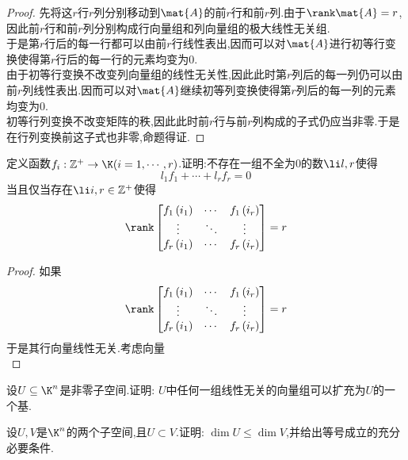 \documentclass{ctexart}
\begin{document}
\begin{proof}
    先将这$r$行$r$列分别移动到$\mat{A}$的前$r$行和前$r$列.由于$\rank\mat{A}=r$,因此前$r$行和前$r$列分别构成行向量组和列向量组的极大线性无关组.\\
    于是第$r$行后的每一行都可以由前$r$行线性表出,因而可以对$\mat{A}$进行初等行变换使得第$r$行后的每一行的元素均变为$0$.\\
    由于初等行变换不改变列向量组的线性无关性,因此此时第$r$列后的每一列仍可以由前$r$列线性表出.因而可以对$\mat{A}$继续初等列变换使得第$r$列后的每一列的元素均变为$0$.\\
    初等行列变换不改变矩阵的秩,因此此时前$r$行与前$r$列构成的子式仍应当非零.于是在行列变换前这子式也非零,命题得证.
\end{proof}
\begin{problem}
    定义函数$f_i:\mathbb{Z}^+\to\K(i=1,\cdots,r)$.证明:不存在一组不全为$0$的数$\li l,r$使得
    \[l_1f_1+\cdots+l_rf_r=0\]
    当且仅当存在$\li i,r\in\mathbb{Z}^+$使得
    \[\rank\begin{bmatrix}
        f_1\left(i_1\right)&\cdots&f_1\left(i_r\right)\\
        \vdots&\ddots&\vdots\\
        f_r\left(i_1\right)&\cdots&f_r\left(i_r\right)
    \end{bmatrix}=r\]
\end{problem}
\begin{proof}
    如果
    \[\rank\begin{bmatrix}
        f_1\left(i_1\right)&\cdots&f_1\left(i_r\right)\\
        \vdots&\ddots&\vdots\\
        f_r\left(i_1\right)&\cdots&f_r\left(i_r\right)
    \end{bmatrix}=r\]
    于是其行向量线性无关.考虑向量
    \[\]
\end{proof}
\begin{problem}
    设$U\subseteq\K^n$是非零子空间.证明: $U$中任何一组线性无关的向量组可以扩充为$U$的一个基.
\end{problem}
\begin{problem}
    设$U,V$是$\K^n$的两个子空间,且$U\subset V$.证明: $\dim U\leq\dim V$,并给出等号成立的充分必要条件.
\end{problem}
\end{document}
